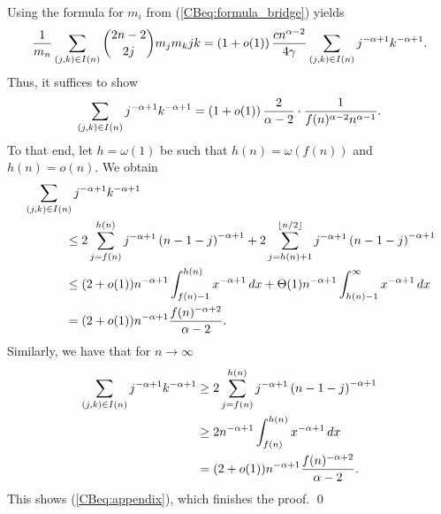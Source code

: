  Using the formula for $m_i$ from (\ref{CBeq:formula_bridge}) yields
 \begin{align*}
 \frac{1}{m_n}\sum_{(j,k)\in I(n)}\binom{2n-2}{2j}m_jm_k j k=\left(1+o(1)\right)\frac{cn^{\alpha-2}}{4\gamma}\sum_{(j,k)\in I(n)}j^{-\alpha+1}k^{-\alpha+1}.
 \end{align*}
 Thus, it suffices to show 
 \begin{align}\label{CBeq:appendix}
 \sum_{(j,k)\in I(n)}j^{-\alpha+1}k^{-\alpha+1}=\left(1+o(1)\right)\frac{2}{\alpha-2}
 \cdot\frac{1}{f(n)^{\alpha-2}n^{\alpha-1}}.
 \end{align}
To that end, let $h=\omega(1)$ be such that $h(n)=\omega\left(f(n)\right)$ and $h(n)=o(n)$. We obtain
\begin{align*}
&\sum_{(j,k)\in I(n)}j^{-\alpha+1}k^{-\alpha+1}
\\
&~~~~~~~~~~\leq 2\sum_{j=f(n)}^{h(n)}j^{-\alpha+1}\left(n-1-j\right)^{-\alpha+1}+2\sum_{j=h(n)+1}^{\lfloor n/2 \rfloor}j^{-\alpha+1}\left(n-1-j\right)^{-\alpha+1}
\\
&~~~~~~~~~~\leq(2+o(1))n^{-\alpha+1}\int_{f(n)-1}^{h(n)}x^{-\alpha+1}\,dx+\Theta(1)n^{-\alpha+1}\int_{h(n)-1}^{\infty}x^{-\alpha+1}\,dx
\\
&~~~~~~~~~~=(2+o(1))n^{-\alpha+1}\frac{f(n)^{-\alpha+2}}{\alpha-2}.
\end{align*}
Similarly, we have that for $n \to \infty$
\begin{align*}
\sum_{(j,k)\in I(n)}j^{-\alpha+1}k^{-\alpha+1}&\geq 2\sum_{j=f(n)}^{h(n)}j^{-\alpha+1}\left(n-1-j\right)^{-\alpha+1}
\\
&\geq 2n^{-\alpha+1}\int_{f(n)}^{h(n)}x^{-\alpha+1}\,dx
\\
&=(2+o(1))n^{-\alpha+1}\frac{f(n)^{-\alpha+2}}{\alpha-2}.
\end{align*}
This shows (\ref{CBeq:appendix}), which finishes the proof. \qed 

